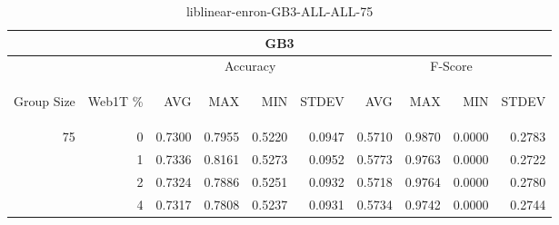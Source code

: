 \begin{center}
\begin{table}[htbp]
\begin{tabular}{ | r | r | r | r | r | r | r | r | r | r |}
\hline
\multicolumn{10}{|c|}{GB3}\\
\hline
 & & \multicolumn{4}{|c|}{Accuracy} & \multicolumn{4}{|c|}{F-Score}\\ \cline{3-10}
\begin{sideways}Group Size\end{sideways} & \begin{sideways}Web1T \%\end{sideways} & \begin{sideways}AVG\end{sideways} & \begin{sideways}MAX\end{sideways} & \begin{sideways}MIN\end{sideways} & \begin{sideways}STDEV\end{sideways} & \begin{sideways}AVG\end{sideways} & \begin{sideways}MAX\end{sideways} & \begin{sideways}MIN\end{sideways} & \begin{sideways}STDEV\end{sideways}\\
\hline
\multirow{4}{*}{75}
 & 0 & 0.7300 & 0.7955 & 0.5220 & 0.0947 & 0.5710 & 0.9870 & 0.0000 & 0.2783\\ \cline{2-10}
 & 1 & 0.7336 & 0.8161 & 0.5273 & 0.0952 & 0.5773 & 0.9763 & 0.0000 & 0.2722\\ \cline{2-10}
 & 2 & 0.7324 & 0.7886 & 0.5251 & 0.0932 & 0.5718 & 0.9764 & 0.0000 & 0.2780\\ \cline{2-10}
 & 4 & 0.7317 & 0.7808 & 0.5237 & 0.0931 & 0.5734 & 0.9742 & 0.0000 & 0.2744\\ \cline{2-10}
\hline
\end{tabular}
\caption{liblinear-enron-GB3-ALL-ALL-75}
\end{table}
\end{center}

